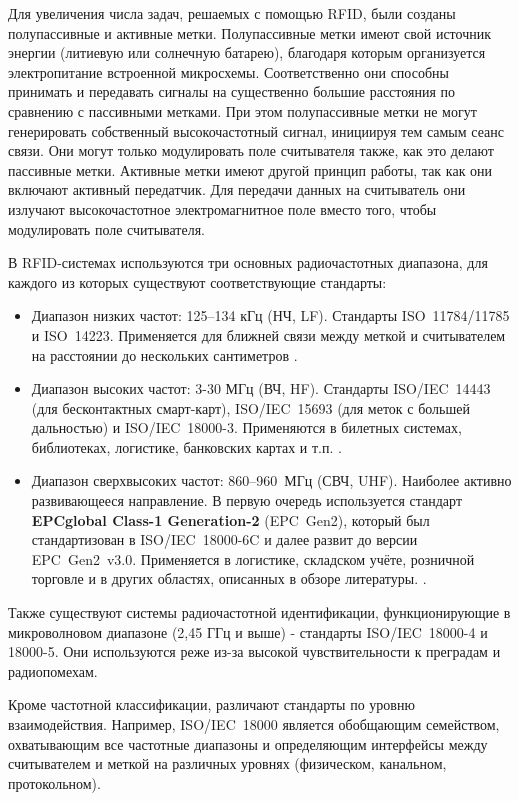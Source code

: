 \documentclass[12pt]{article}
\theoremstyle{definition}
\begin{document}
Для увеличения числа задач, решаемых с помощью RFID, были созданы полупассивные и активные метки. Полупассивные метки имеют свой источник энергии (литиевую или солнечную батарею), благодаря которым организуется электропитание встроенной микросхемы. Соответственно они способны принимать и передавать сигналы на существенно большие расстояния по сравнению с пассивными метками. При этом полупассивные метки не могут генерировать собственный высокочастотный сигнал, инициируя тем самым сеанс связи. Они могут только модулировать поле считывателя также, как это делают пассивные метки. Активные метки имеют другой принцип работы, так как они включают активный передатчик. Для передачи данных на считыватель они излучают высокочастотное электромагнитное поле вместо того, чтобы модулировать поле считывателя.

В RFID-системах используются три основных радиочастотных диапазона, для каждого из которых существуют соответствующие стандарты:

\begin{itemize}
    \item Диапазон низких частот: 125–134 кГц (НЧ, LF). Стандарты ISO~11784/11785 и ISO~14223. Применяется для ближней связи между меткой и считывателем на расстоянии до нескольких сантиметров \cite{LFRFID}.
    \item Диапазон высоких частот: 3-30 МГц (ВЧ, HF). Стандарты ISO/IEC~14443 (для бесконтактных смарт-карт), ISO/IEC~15693 (для меток с большей дальностью) и ISO/IEC~18000-3. Применяются в билетных системах, библиотеках, логистике, банковских картах и т.п. \cite{HFRFID}.
    \item Диапазон сверхвысоких частот: 860--960~МГц (СВЧ, UHF). Наиболее активно развивающееся направление. В первую очередь используется стандарт \textbf{EPCglobal Class-1 Generation-2} (EPC~Gen2), который был стандартизован в ISO/IEC~18000-6C и далее развит до версии EPC~Gen2~v3.0. Применяется в логистике, складском учёте, розничной торговле и в других областях, описанных в обзоре литературы. \cite{StdGen2}.
\end{itemize}

Также существуют системы радиочастотной идентификации, функционирующие в микроволновом диапазоне (2{,}45 ГГц и выше) - стандарты ISO/IEC~18000-4 и 18000-5. Они используются реже из-за высокой чувствительности к преградам и радиопомехам.

Кроме частотной классификации, различают стандарты по уровню взаимодействия. Например, ISO/IEC~18000 является обобщающим семейством, охватывающим все частотные диапазоны и определяющим интерфейсы между считывателем и меткой на различных уровнях (физическом, канальном, протокольном).
\end{document}
